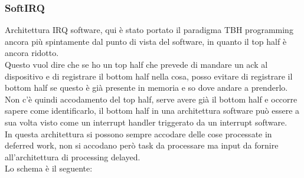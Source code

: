 \documentclass[12pt, oneside]{extbook}
\begin{document}
\subsubsection{SoftIRQ}
Architettura IRQ software, qui è stato portato il paradigma TBH programming ancora più spintamente dal punto di vista del software, in quanto il top half è ancora ridotto.\\Questo vuol dire che se ho un top half che prevede di mandare un ack al dispositivo e di registrare il bottom half nella cosa, posso evitare di registrare il bottom half se questo è già presente in memoria e so dove andare a prenderlo.\\Non c'è quindi accodamento del top half, serve avere già il bottom half e occorre sapere come identificarlo, il bottom half in una architettura software può essere a sua volta visto come un interrupt handler triggerato da un interrupt software.\\In questa architettura si possono sempre accodare delle cose processate in deferred work, non si accodano però task da processare ma input da fornire all'architettura di processing delayed.\\Lo schema è il seguente:
\end{document}
